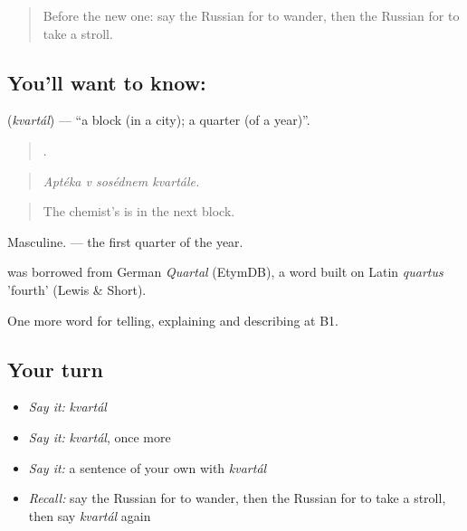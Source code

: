 \label{lesson:RU-C443-kvartal}



\begin{quote}
Before the new one: say the Russian for to wander, then the Russian for to take a stroll.
\end{quote}

\subsection*{You'll want to know: }
\textbf{} (\emph{kvartál}) — \textquotedblleft{}a block (in a city); a quarter (of a year)\textquotedblright{}.

\begin{quote}
   .
\end{quote}

\begin{quote}
\emph{Aptéka v sosédnem kvartále.}
\end{quote}

\begin{quote}
The chemist's is in the next block.
\end{quote}

Masculine. \emph{ } — the first quarter of the year.

\begin{cousinweb}
\emph{} was borrowed from German \emph{Quartal} (EtymDB), a word built on Latin \emph{quartus} 'fourth' (Lewis \& Short).
\end{cousinweb}

\begin{grammarlens}[title={What you've built}]
One more word for telling, explaining and describing at B1.
\end{grammarlens}

\subsection*{Your turn}
\begin{itemize}
\raggedright
  \item \emph{Say it:} \emph{kvartál}
  \item \emph{Say it:} \emph{kvartál}, once more
  \item \emph{Say it:} a sentence of your own with \emph{kvartál}
  \item \emph{Recall:} say the Russian for to wander, then the Russian for to take a stroll, then say \emph{kvartál} again
\end{itemize}


